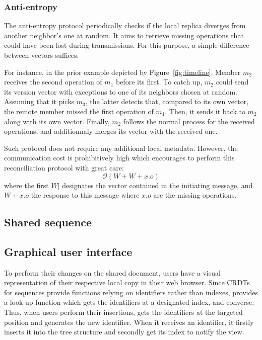 \subsubsection{Anti-entropy} 

The anti-entropy protocol periodically checks if the local replica diverges from
another neighbor's one at random. It aims to retrieve missing operations that
could have been lost during transmissions. For this purpose, a simple difference
between vectors suffices.

For instance, in the prior example depicted by Figure~\ref{fig:timeline}, Member
$m_2$ receives the second operation of $m_1$ before its first. To catch up,
$m_2$ could send its version vector with exceptions to one of its neighbors
chosen at random. Assuming that it picks $m_3$, the latter detects that,
compared to its own vector, the remote member missed the first operation of
$m_1$. Then, it sends it back to $m_2$ along with its own vector. Finally, $m_2$
follows the normal process for the received operations, and additionnaly merges
its vector with the received one.

Such protocol does not require any additional local metadata. However, the
communication cost is prohibitively high which encourages to perform this
reconciliation protocol with great care:
\begin{equation}
  \mathcal{O}(W+W+x.o)
\end{equation}
where the first $W|$ designates the vector contained in the initiating
message, and $W+x.o$ the response to this message where $x.o$ are the missing
operations.

\subsection{Shared sequence}

    
\subsection{Graphical user interface}

To perform their changes on the shared document, users have a visual
representation of their respective local copy in their web browser.  Since CRDTs
for sequences provide functions relying on identifiers rather than indexes,
\CRATE provides a look-up function which gets the identifiers at a designated
index, and converse.  Thus, when users perform their insertions, \CRATE gets the
identifiers at the targeted position and generates the new identifier. When it
receives an identifier, it firstly inserts it into the tree structure and
secondly get its index to notify the view.

